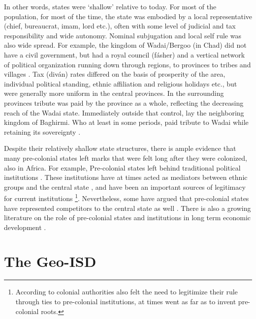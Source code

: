 \documentclass[12pt]{article}
\begin{document}

In other words, states were `shallow' relative to today. For most of the
population, for most of the time, the state was embodied by a local
representative (chief, bureaucrat, imam, lord etc.), often with some level of
judicial and tax responsibility and wide autonomy. Nominal subjugation and local
self rule was also wide spread. For example, the kingdom of Wadai/Bergoo (in
Chad) did not have a civil government, but had a royal council (fásher) and a
vertical network of political organization running down through regions, to
provinces to tribes and villages \citep{barth1857travels}. Tax (diván) rates
differed on the basis of prosperity of the area, individual political standing,
ethnic affiliation and religious holidays etc., but were generally more uniform
in the central provinces. In the surrounding provinces tribute was paid by the
province as a whole, reflecting the decreasing reach of the Wadai state.
Immediately outside that control, lay the neighboring kingdom of Baghirmi. Who
at least in some periods, paid tribute to Wadai while retaining its sovereignty
\citep{barth1857travels}.

Despite their relatively shallow state structures, there is ample evidence that
many pre-colonial states left marks that were felt long after they were
colonized, also in Africa. For example, Pre-colonial states left behind
traditional political institutions \citep{Beall_2005, Holzinger_2020,
Neupert_Wentz_2021, Ubink_2008}. These institutions have at times acted as
mediators between ethnic groups and the central state \citep{boone2014property,
Englebert2002}, and have been an important sources of legitimacy for current
institutions \citep{Wig2016}\footnote{According to \citet{mamdani2018citizen}
	colonial authorities also felt the need to legitimize their rule through
	ties to pre-colonial institutions, at times went as far as to invent
pre-colonial roots.}. Nevertheless, some have argued that pre-colonial states
have represented competitors to the central state as well \citep{Herbst2014}.
There is also a growing literature on the role of pre-colonial states and
institutions in long term economic development \citep{Michalopoulos2018,
Acemoglu2014, Gennaioli2007, Bockstette2002, Wilfahrt_2021}.

\section{The Geo-ISD} \label{The Geo-ISD}
\end{document}
